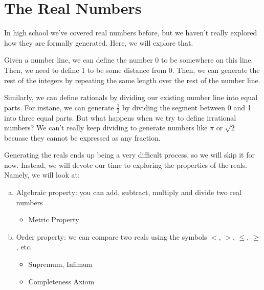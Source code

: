 \section{The Real Numbers}

In high school we've covered real numbers before, but we haven't really explored how they are formally generated. Here, we will explore that.

Given a number line, we can define the number 0 to be somewhere on this line. Then, we need to define 1 to be some distance from 0. Then, we can generate the rest of the integers by repeating the same length over the rest of the number line. 

\begin{center}
\end{center}

Similarly, we can define rationals by dividing our existing number line into equal parts. For instane, we can generate $\frac 13$ by dividing the segment between 0 and 1 into three equal parts. But what happens when we try to define irrational numbers? We can't really keep dividing to generate numbers like $\pi$ or $\sqrt 2$ becuase they cannot be expressed as any fraction.

Generating the reals ends up being a very difficult process, so we will skip it for now. Instead, we will devote our time to exploring the properties of the reals. Namely, we will look at:

\begin{enumerate}[(a)]
    \item Algebraic property: you can add, subtract, multiply and divide two real numbers
    \begin{itemize}
        \item Metric Property
    \end{itemize}
    \item Order property: we can compare two reals using the symbols $<$, $>$, $\le$, $\ge$, etc.
    \begin{itemize}
        \item Supremum, Infimum
        \item Completeness Axiom
    \end{itemize}
\end{enumerate}


